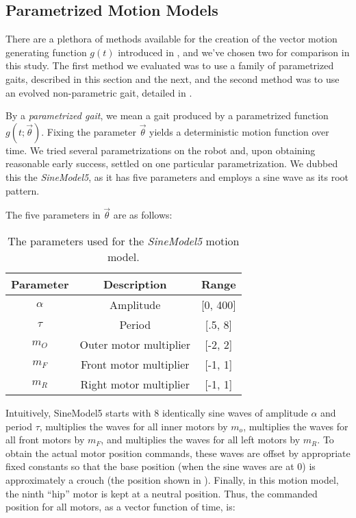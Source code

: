 \subsection{Parametrized Motion Models}

There are a plethora of methods available for the creation of the
vector motion generating function $g(t)$ introduced in
, and we've chosen two for comparison in
this study.  The first method we evaluated was to use a family of
parametrized gaits, described in this section and the next, and the
second method was to use an evolved non-parametric gait, detailed in
.

By a \emph{parametrized gait}, we mean a gait produced by a
parametrized function $g(t; \vec{\theta})$. Fixing the parameter
$\vec{\theta}$ yields a deterministic motion function over time.  We
tried several parametrizations on the robot and, upon obtaining
reasonable early success, settled on one particular parametrization.
We dubbed this the \emph{SineModel5}, as it has five parameters and
employs a sine wave as its root pattern.

The five parameters in $\vec{\theta}$ are as follows:


\newcommand{\amp}{\ensuremath{\alpha}}

\begin{table}[h!]
\begin{center}
\begin{tabular}{|c|c|c|}
\hline
Parameter    & Description               & Range \\
\hline
\hline
\amp         & Amplitude                 & [0, 400] \\
\hline
$\tau$       & Period                    & [.5, 8] \\
\hline
$m_O$        & Outer motor multiplier    & [-2, 2] \\
\hline
$m_F$        & Front motor multiplier    & [-1, 1] \\
\hline
$m_R$        & Right motor multiplier    & [-1, 1] \\
\hline
\end{tabular}
\caption{The parameters used for the \emph{SineModel5} motion model.}
\end{center}
\end{table}


Intuitively, SineModel5 starts with 8 identically sine waves of
amplitude $\amp$ and period $\tau$, multiplies the waves for all inner
motors by $m_o$, multiplies the waves for all front motors by $m_F$,
and multiplies the waves for all left motors by $m_R$.  To obtain the
actual motor position commands, these waves are offset by
appropriate fixed constants so that the base position (when the sine
waves are at 0) is approximately a crouch (the position shown in
).  Finally, in this motion model, the ninth
``hip'' motor is kept at a neutral position.  Thus, the commanded
position for all motors, as a vector function of time, is:

